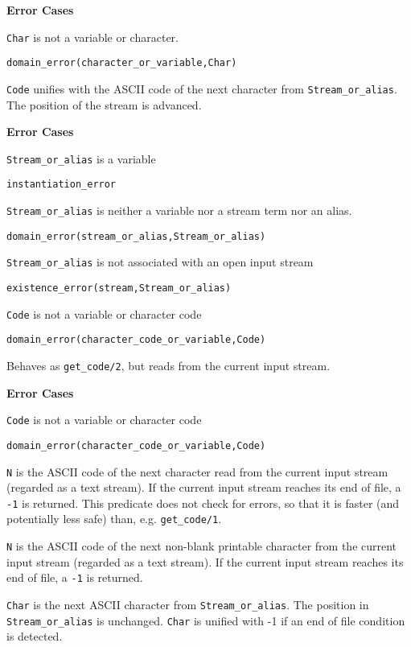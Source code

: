 \begin{description}
{\bf Error Cases}
\bi
\item 	{\tt Char} is not a variable or character.
\bi
\item 	{\tt domain\_error(character\_or\_variable,Char)}
\ei
\ei

%
   {\tt Code} unifies with the ASCII code of the next character from
   {\tt Stream\_or\_alias}.  The position of the stream is advanced.

{\bf Error Cases}
\bi
\item 	{\tt Stream\_or\_alias} is a variable
\bi
\item {\tt instantiation\_error}
\ei
\item 	{\tt Stream\_or\_alias} is neither a variable nor a stream term nor an alias.
\bi
\item 	{\tt domain\_error(stream\_or\_alias,Stream\_or\_alias)}
\ei
\item 	{\tt Stream\_or\_alias} is not associated with an open input stream
\bi
\item 	{\tt existence\_error(stream,Stream\_or\_alias)}
\ei
\item 	{\tt Code} is not a variable or character code
\bi
\item 	{\tt domain\_error(character\_code\_or\_variable,Code)}
\ei
\ei

%
Behaves as {\tt get\_code/2}, but reads from the current input stream.

{\bf Error Cases}
\bi
\item 	{\tt Code} is not a variable or character code
\bi
\item 	{\tt domain\_error(character\_code\_or\_variable,Code)}
\ei
\ei

%
{\tt N} is the ASCII code of the next character read from the current
input stream (regarded as a text stream). If the current input stream
reaches its end of file, a {\tt -1} is returned.  This predicate does
not check for errors, so that it is faster (and potentially less safe)
than, e.g. {\tt get\_code/1}.

    {\tt N} is the ASCII code of the next non-blank printable
    character from the current input stream (regarded as a text
    stream).  If the current input stream reaches its end of file, a
    {\tt -1} is returned.


%
{\tt Char} is the next ASCII character from {\tt Stream\_or\_alias}.
The position in {\tt Stream\_or\_alias} is unchanged.  {\tt Char} is
unified with -1 if an end of file condition is detected.


\end{description}
